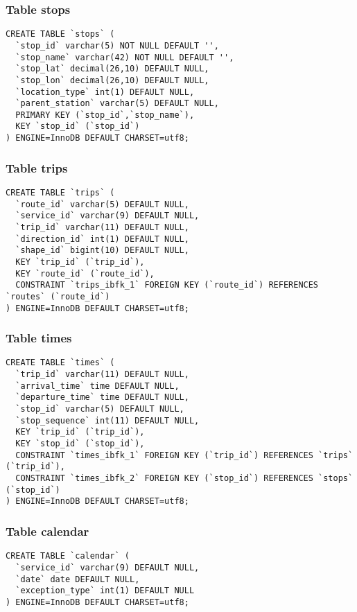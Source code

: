 \documentclass{beamer}
\begin{document}
\begin{frame}[fragile]
  \frametitle{Table stops}
  \begin{lstlisting}
CREATE TABLE `stops` (
  `stop_id` varchar(5) NOT NULL DEFAULT '',
  `stop_name` varchar(42) NOT NULL DEFAULT '',
  `stop_lat` decimal(26,10) DEFAULT NULL,
  `stop_lon` decimal(26,10) DEFAULT NULL,
  `location_type` int(1) DEFAULT NULL,
  `parent_station` varchar(5) DEFAULT NULL,
  PRIMARY KEY (`stop_id`,`stop_name`),
  KEY `stop_id` (`stop_id`)
) ENGINE=InnoDB DEFAULT CHARSET=utf8;
  \end{lstlisting}  
\end{frame}


\begin{frame}[fragile]
  \frametitle{Table trips}
  \begin{lstlisting}
CREATE TABLE `trips` (
  `route_id` varchar(5) DEFAULT NULL,
  `service_id` varchar(9) DEFAULT NULL,
  `trip_id` varchar(11) DEFAULT NULL,
  `direction_id` int(1) DEFAULT NULL,
  `shape_id` bigint(10) DEFAULT NULL,
  KEY `trip_id` (`trip_id`),
  KEY `route_id` (`route_id`),
  CONSTRAINT `trips_ibfk_1` FOREIGN KEY (`route_id`) REFERENCES `routes` (`route_id`)
) ENGINE=InnoDB DEFAULT CHARSET=utf8;
  \end{lstlisting}  
\end{frame}

\begin{frame}[fragile]
  \frametitle{Table times}
  \begin{lstlisting}
CREATE TABLE `times` (
  `trip_id` varchar(11) DEFAULT NULL,
  `arrival_time` time DEFAULT NULL,
  `departure_time` time DEFAULT NULL,
  `stop_id` varchar(5) DEFAULT NULL,
  `stop_sequence` int(11) DEFAULT NULL,
  KEY `trip_id` (`trip_id`),
  KEY `stop_id` (`stop_id`),
  CONSTRAINT `times_ibfk_1` FOREIGN KEY (`trip_id`) REFERENCES `trips` (`trip_id`),
  CONSTRAINT `times_ibfk_2` FOREIGN KEY (`stop_id`) REFERENCES `stops` (`stop_id`)
) ENGINE=InnoDB DEFAULT CHARSET=utf8;
  \end{lstlisting}  
\end{frame}

\begin{frame}[fragile]
  \frametitle{Table calendar}
  \begin{lstlisting}
CREATE TABLE `calendar` (
  `service_id` varchar(9) DEFAULT NULL,
  `date` date DEFAULT NULL,
  `exception_type` int(1) DEFAULT NULL
) ENGINE=InnoDB DEFAULT CHARSET=utf8;
\end{lstlisting}
\end{frame}
\end{document}
